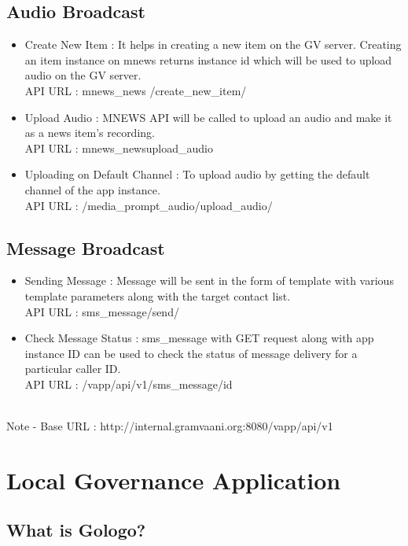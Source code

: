 \section{Audio Broadcast}
\begin{itemize}
\item Create New Item : It helps in creating a new item on the GV server. Creating an item instance on mnews returns instance id which will be used to upload audio on the GV server.
\ \\
API URL : mnews\_news /create\_new\_item/
\item Upload Audio : MNEWS API will be called to upload an audio and make it as a news item's recording.
\ \\
API URL : mnews\_news\/upload\_audio\/
\item Uploading on Default Channel : To upload audio by getting the default channel of the app instance.
\ \\
API URL : /media\_prompt\_audio/upload\_audio/
\end{itemize}

\newpage
\section{Message Broadcast}
\begin{itemize}
\item Sending Message : Message will be sent in the form of template with various template parameters along with the target contact list.
\ \\
API URL : sms\_message/send/
\item Check Message Status : sms\_message with GET request along with app instance ID can be used to check the status of message delivery for a particular caller ID.
\ \\
API URL : /vapp/api/v1/sms\_message/id
\end{itemize}

\ \\

Note - Base URL : http://internal.gramvaani.org:8080/vapp/api/v1


\chapter {Local Governance Application}

\section {What is Gologo?}

